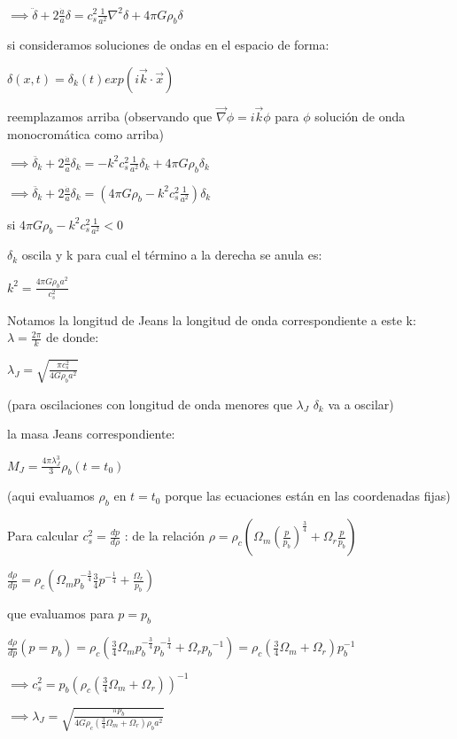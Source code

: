 \documentclass[12pt]{book}
\begin{document}
$\implies \ddot{\delta} + 2 \frac{\dot{a}}{a} \delta = c_s^2 \frac{1}{a^2} \nabla^2{\delta} + 4 \pi G \rho_b \delta$

si consideramos soluciones de ondas en el espacio de forma:

$\delta(x,t) = \delta_k(t) exp(i \vec{k} \cdot \vec{x})$

reemplazamos arriba (observando que $\vec{\nabla}{\phi} = i \vec{k} \phi$ para $\phi$ solución de onda monocromática como arriba)


$\implies \ddot{\delta_k} + 2 \frac{\dot{a}}{a} \delta_k = -k^2 c_s^2 \frac{1}{a^2} \delta_k + 4 \pi G \rho_b \delta_k$

$\implies \ddot{\delta_k} + 2 \frac{\dot{a}}{a} \delta_k = (4 \pi G \rho_b - k^2 c_s^2 \frac{1}{a^2}) \delta_k $

si $4 \pi G \rho_b - k^2 c_s^2 \frac{1}{a^2} < 0 $ 

$\delta_k$ oscila y k para cual el término a la derecha se anula es:
 
$k^2 = \frac{4 \pi G \rho_b a^2}{c_s^2}$

Notamos la longitud de Jeans la longitud de onda correspondiente a este k: $\lambda = \frac{2\pi}{k}$ de donde:

$\lambda_J = \sqrt{\frac{\pi c_s^2}{4 G \rho_b a^2}}$

(para oscilaciones con longitud de onda menores que $\lambda_J$ $\delta_k$ va a oscilar)

la masa Jeans correspondiente:

$M_J = \frac{4 \pi \lambda_J^3}{3} \rho_b(t=t_0) $ 

(aqui evaluamos $\rho_b$ en $t=t_0$ porque las ecuaciones están en las coordenadas fijas)

Para calcular $c_s^2 = \frac{dp}{d\rho}$ : de la relación $\rho = \rho_c (\Omega_m (\frac{p}{p_b})^{\frac{3}{4}} + \Omega_r \frac{p}{p_b}  )$

$\frac{d\rho}{dp} = \rho_c (\Omega_m p_b^{-\frac{3}{4}} \frac{3}{4} p^{-\frac{1}{4}} + \frac{\Omega_r}{p_b} )$

que evaluamos para $p=p_b$

$\frac{d\rho}{dp}(p=p_b) = \rho_c (\frac{3}{4} \Omega_m p_b^{-\frac{3}{4}}  p_b^{-\frac{1}{4}} + \Omega_r{p_b}^{-1} ) = 
 \rho_c (\frac{3}{4} \Omega_m + \Omega_r) p_b^{-1} $


$\implies c_s^2 = p_b (\rho_c (\frac{3}{4} \Omega_m + \Omega_r))^{-1} $

$\implies \lambda_J = \sqrt{\frac{\pi p_b}{4 G \rho_c (\frac{3}{4} \Omega_m + \Omega_r)\rho_b a^2}}$
\end{document}
